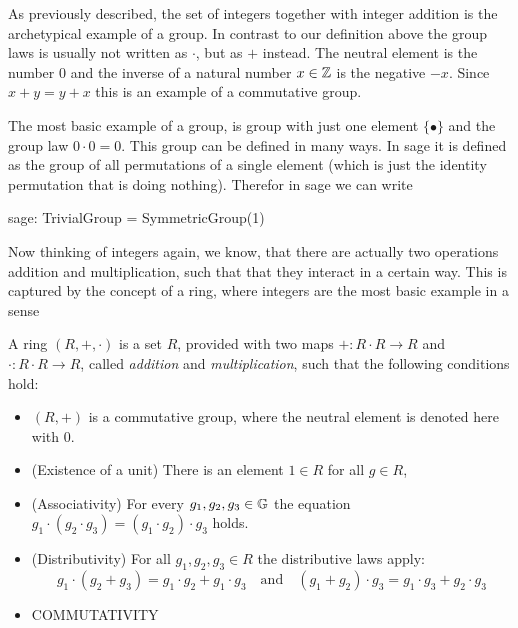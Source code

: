 \begin{example}
As previously described, the set of integers together with integer addition is the archetypical example of a group. In contrast to our definition above the group laws is usually not written as $\cdot$, but as $+$ instead. The neutral element is the number $0$ and the inverse of a natural number $x\in\mathbb{Z}$ is the negative $-x$. Since $x+y=y+x$ this is an example of a commutative group.
\end{example}
\begin{example}
The most basic example of a group, is group with just one element $\{\bullet\}$ and the group law $0\cdot 0=0$. This group can be defined in many ways. In sage it is defined as the group of all permutations of a single element (which is just the identity permutation that is doing nothing). Therefor in sage we can write
 \begin{sagecommandline}
sage: TrivialGroup = SymmetricGroup(1)
\end{sagecommandline}
\end{example}
Now thinking of integers again, we know, that there are actually two operations addition and multiplication, such that that they interact in a certain way. This is captured by the concept of a ring, where integers are the most basic example in a sense



\begin{definition}
A ring $ (R, +, \cdot) $ is a set $R$, provided with two maps $ +: R \cdot R \to R $ and $ \cdot: R \cdot R \to R $, called \textit{addition} and \textit{multiplication}, such that the following conditions hold:
\begin{itemize}
\item $ \left (R, + \right) $ is a commutative group, where the neutral element is denoted here with $ 0 $.
\item (Existence of a unit) There is an element $1\in R$ for all $g\in R$, 
\item (Associativity) For every $g_1,g_2,g_3\in\mathbb{G}$ the equation 
$g_1\cdot(g_2\cdot g_3) = (g_1\cdot g_2)\cdot g_3$ holds. 
\item (Distributivity) For all $ g_1, g_2, g_3 \in R $ the distributive laws apply:
$$ g_1 \cdot \left (g_2 + g_3 \right) = g_1 \cdot g_2 + g_1 \cdot g_3 \quad \text{and} \quad
\left (g_1 + g_2 \right) \cdot g_3 = g_1 \cdot g_3 + g_2 \cdot g_3 $$
\item COMMUTATIVITY
\end{itemize}
\end{definition}

